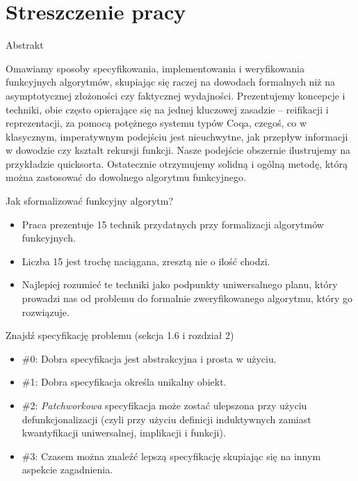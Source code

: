 \documentclass{beamer}
\begin{document}
\section{Streszczenie pracy}

\begin{frame}{Abstrakt}
\begin{center}
	Omawiamy sposoby specyfikowania, implementowania i weryfikowania funkcyjnych algorytmów, skupiając się raczej na dowodach formalnych niż na asymptotycznej złożoności czy faktycznej wydajności. Prezentujemy koncepcje i techniki, obie często opierające się na jednej kluczowej zasadzie -- reifikacji i reprezentacji, za pomocą potężnego systemu typów Coqa, czegoś, co w klasycznym, imperatywnym podejściu jest nieuchwytne, jak przepływ informacji w dowodzie czy kształt rekursji funkcji. Nasze podejście obszernie ilustrujemy na przykładzie quicksorta. Ostatecznie otrzymujemy solidną i ogólną metodę, którą można zastosować do dowolnego algorytmu funkcyjnego.
\end{center}
\end{frame}

\begin{frame}{Jak sformalizować funkcyjny algorytm?}
\begin{itemize}
	\item Praca prezentuje 15 technik przydatnych przy formalizacji algorytmów funkcyjnych.
	\item Liczba 15 jest trochę naciągana, zresztą nie o ilość chodzi.
	\item Najlepiej rozumieć te techniki jako podpunkty uniwersalnego planu, który prowadzi nas od problemu do formalnie zweryfikowanego algorytmu, który go rozwiązuje.
\end{itemize}
\end{frame}

\begin{frame}{Znajdź specyfikację problemu (sekcja 1.6 i rozdział 2)}
\begin{itemize}
	\item \#0: Dobra specyfikacja jest abstrakcyjna i prosta w użyciu.
	\item \#1: Dobra specyfikacja określa unikalny obiekt.
	\item \#2: \textit{Patchworkowa} specyfikacja może zostać ulepszona przy użyciu defunkcjonalizacji (czyli przy użyciu definicji induktywnych zamiast kwantyfikacji uniwersalnej, implikacji i funkcji).
	\item \#3: Czasem można znaleźć lepszą specyfikację skupiając się na innym aspekcie zagadnienia.
\end{itemize}
\end{frame}
\end{document}
